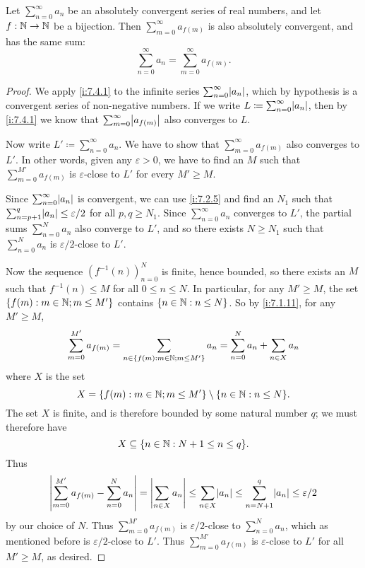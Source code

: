 \setcounter{thm}{2}
\begin{prop}\label{i:7.4.3}
  Let \(\sum_{n = 0}^\infty a_n\) be an absolutely convergent series of real numbers, and let \(f : \mathbb{N} \to \mathbb{N}\) be a bijection.
  Then \(\sum_{m = 0}^\infty a_{f(m)}\) is also absolutely convergent, and has the same sum:
  \[
    \sum_{n = 0}^\infty a_n = \sum_{m = 0}^\infty a_{f(m)}.
  \]
\end{prop}

\begin{proof}
  We apply \cref{i:7.4.1} to the infinite series \(\sum_{n = 0}^\infty \abs{a_n}\), which by hypothesis is a convergent series of non-negative numbers.
  If we write \(L \coloneqq \sum_{n = 0}^\infty \abs{a_n}\), then by \cref{i:7.4.1} we know that \(\sum_{m = 0}^\infty \abs{a_{f(m)}}\) also converges to \(L\).

  Now write \(L' \coloneqq \sum_{n = 0}^\infty a_n\).
  We have to show that \(\sum_{m = 0}^\infty a_{f(m)}\) also converges to \(L'\).
  In other words, given any \(\varepsilon > 0\), we have to find an \(M\) such that \(\sum_{m = 0}^{M'} a_{f(m)}\) is \(\varepsilon\)-close to \(L'\) for every \(M' \geq M\).

  Since \(\sum_{n = 0}^\infty \abs{a_n}\) is convergent, we can use \cref{i:7.2.5} and find an \(N_1\) such that \(\sum_{n = p + 1}^q \abs{a_n} \leq \varepsilon / 2\) for all \(p, q \geq N_1\).
  Since \(\sum_{n = 0}^\infty a_n\) converges to \(L'\), the partial sums \(\sum_{n = 0}^N a_n\) also converge to \(L'\), and so there exists \(N \geq N_1\) such that \(\sum_{n = 0}^N a_n\) is \(\varepsilon / 2\)-close to \(L'\).

  Now the sequence \((f^{-1}(n))_{n = 0}^N\) is finite, hence bounded, so there exists an \(M\) such that \(f^{-1}(n) \leq M\) for all \(0 \leq n \leq N\).
  In particular, for any \(M' \geq M\), the set \(\left\lbrace f(m) : m \in \mathbb{N}; m \leq M'\right\rbrace\) contains \(\left\lbrace n \in \mathbb{N} : n \leq N\right\rbrace\).
  So by \cref{i:7.1.11}, for any \(M' \geq M\),
  \[
    \sum_{m = 0}^{M'} a_{f(m)} = \sum_{n \in \left\lbrace f(m) : m \in \mathbb{N}; m \leq M'\right\rbrace} a_n = \sum_{n = 0}^N a_n + \sum_{n \in X} a_n
  \]
  where \(X\) is the set
  \[
    X = \set{f(m) : m \in \N; m \leq M'} \setminus \set{n \in \N : n \leq N}.
  \]
  The set \(X\) is finite, and is therefore bounded by some natural number \(q\);
  we must therefore have
  \[
    X \subseteq \set{n \in \N : N + 1 \leq n \leq q}.
  \]
  Thus
  \[
    \abs{\sum_{m = 0}^{M'} a_{f(m)} - \sum_{n = 0}^N a_n} = \abs{\sum_{n \in X} a_n} \leq \sum_{n \in X} \abs{a_n} \leq \sum_{n = N + 1}^q \abs{a_n} \leq \varepsilon / 2
  \]
  by our choice of \(N\).
  Thus \(\sum_{m = 0}^{M'} a_{f(m)}\) is \(\varepsilon / 2\)-close to \(\sum_{n = 0}^N a_n\), which as mentioned before is \(\varepsilon / 2\)-close to \(L'\).
  Thus \(\sum_{m = 0}^{M'} a_{f(m)}\) is \(\varepsilon\)-close to \(L'\) for all \(M' \geq M\), as desired.
\end{proof}

